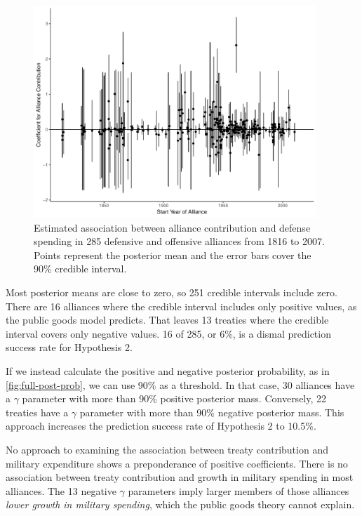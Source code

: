 \documentclass[12pt]{article}
\begin{document}
\begin{figure}[htbp]
	\centering
		\includegraphics[width=0.95\textwidth]{alliance-coefs-year.pdf}
	\caption{Estimated association between alliance contribution and defense spending in 285 defensive and offensive alliances from 1816 to 2007. Points represent the posterior mean and the error bars cover the 90\% credible interval.}
	\label{fig:alliance-coefs-year}
\end{figure}


Most posterior means are close to zero, so 251 credible intervals include zero. 
There are 16 alliances where the credible interval includes only positive values, as the public goods model predicts. 
That leaves 13 treaties where the credible interval covers only negative values.
16 of 285, or 6\%, is a dismal prediction success rate for Hypothesis 2. 


If we instead calculate the positive and negative posterior probability, as in \autoref{fig:full-post-prob}, we can use 90\% as a threshold. 
In that case, 30 alliances have a $\gamma$ parameter with more than 90\% positive posterior mass. 
Conversely, 22 treaties have a $\gamma$ parameter with more than 90\% negative posterior mass. 
This approach increases the prediction success rate of Hypothesis 2 to 10.5\%. 
 

No approach to examining the association between treaty contribution and military expenditure shows a preponderance of positive coefficients. 
There is no association between treaty contribution and growth in military spending in most alliances.
The 13 negative $\gamma$ parameters imply larger members of those alliances \emph{lower growth in military spending}, which the public goods theory cannot explain. 
\end{document}
